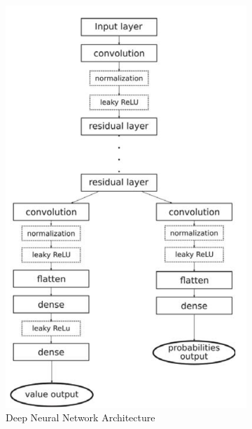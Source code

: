 \begin{figure}[htb]
    \centering
    \begin{subfigure}{0.4\textwidth}
        \centering
        \includegraphics[scale=0.25]{images/checkers_nn.png}
        \caption{Deep Neural Network Architecture}
        \label{fig:dnn}
    \end{subfigure}
    \qquad
    \begin{subfigure}{0.4\textwidth}
        \centering

\end{subfigure}
\end{figure}
